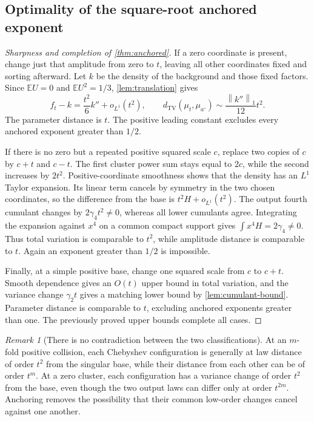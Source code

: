 \documentclass[11pt,a4paper]{article}
\numberwithin{equation}{section}
\theoremstyle{definition}
\theoremstyle{remark}
\newtheorem{remark}[remark]{Remark}
\newcommand{\E}{\mathbb E}
\newcommand{\TV}{d_{\mathrm{TV}}}
\newcommand{\norm}[1]{\left\lVert#1\right\rVert}
\newcommand{\base}{a^{\circ}}
\begin{document}
\subsection{Optimality of the square-root anchored exponent}
\begin{proof}[Sharpness and completion of \cref{thm:anchored}]
If a zero coordinate is present, change just that amplitude from zero to $t$,
leaving all other coordinates fixed and sorting afterward.  Let $k$ be the density
of the background and those fixed factors.  Since $\E U=0$ and $\E U^2=1/3$,
\cref{lem:translation} gives
\begin{equation}
 f_t-k=\frac{t^2}{6}k''+o_{L^1}(t^2),\qquad
 \TV(\mu_t,\mu_{\base})\sim\frac{\norm{k''}_1}{12}t^2.
 \label{eq:anchored-zero}
\end{equation}
The parameter distance is $t$.  The positive leading constant excludes every
anchored exponent greater than $1/2$.

If there is no zero but a repeated positive squared scale $c$, replace two
copies of $c$ by $c+t$ and $c-t$.  The first cluster power sum stays equal to
$2c$, while the second increases by $2t^2$.  Positive-coordinate smoothness
shows that the density has an $L^1$ Taylor expansion.  Its linear term cancels
by symmetry in the two chosen coordinates, so the difference from the base is
$t^2H+o_{L^1}(t^2)$.  The output fourth cumulant changes by
$2\gamma_4t^2\ne0$, whereas all lower cumulants agree.  Integrating the expansion
against $x^4$ on a common compact support gives $\int x^4H=2\gamma_4\ne0$.
Thus total variation is comparable to $t^2$, while amplitude distance is
comparable to $t$.  Again an exponent greater than $1/2$ is impossible.

Finally, at a simple positive base, change one squared scale from $c$ to $c+t$.
Smooth dependence gives an $O(t)$ upper bound in total variation, and the
variance change $\gamma_2t$ gives a matching lower bound by
\cref{lem:cumulant-bound}.  Parameter distance is comparable to $t$, excluding
anchored exponents greater than one.  The previously proved upper bounds
complete all cases.
\end{proof}

\begin{remark}[There is no contradiction between the two classifications]
At an $m$-fold positive collision, each Chebyshev configuration is generally
at law distance of order $t^2$ from the singular base, while their distance
from each other can be of order $t^m$.  At a zero cluster, each configuration
has a variance change of order $t^2$ from the base, even though the two output
laws can differ only at order $t^{2m}$.  Anchoring removes the possibility that
their common low-order changes cancel against one another.
\end{remark}
\end{document}
